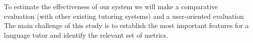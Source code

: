 To estimate the effectiveness of our system we will make a comparative
evaluation (with other existing tutoring systems) and a user-oriented evaluation
The main challenge of this study is to establish the most important features for
a language tutor and identify the relevant set of metrics. 








